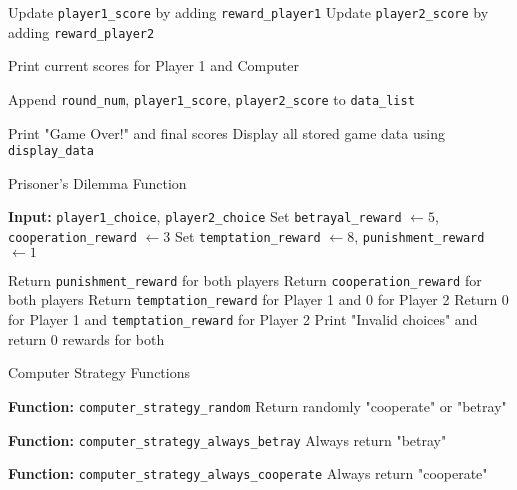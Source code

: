 \documentclass{article}
\begin{document}
\begin{algorithm}[H]
\begin{algorithmic}[1]
    \STATE Update \texttt{player1\_score} by adding \texttt{reward\_player1}
    \STATE Update \texttt{player2\_score} by adding \texttt{reward\_player2}

    \STATE Print current scores for Player 1 and Computer

    \STATE Append \texttt{round\_num}, \texttt{player1\_score}, \texttt{player2\_score} to \texttt{data\_list}

\ENDFOR

\STATE Print "Game Over!" and final scores
\STATE Display all stored game data using \texttt{display\_data}
\end{algorithmic}
\end{algorithm}

\begin{algorithm}[H]
\caption{Prisoner's Dilemma Function}
\begin{algorithmic}[1]
\STATE \textbf{Input:} \texttt{player1\_choice}, \texttt{player2\_choice}
\STATE Set \texttt{betrayal\_reward} $\gets 5$, \texttt{cooperation\_reward} $\gets 3$
\STATE Set \texttt{temptation\_reward} $\gets 8$, \texttt{punishment\_reward} $\gets 1$

    \STATE Return \texttt{punishment\_reward} for both players
    \STATE Return \texttt{cooperation\_reward} for both players
    \STATE Return \texttt{temptation\_reward} for Player 1 and 0 for Player 2
    \STATE Return 0 for Player 1 and \texttt{temptation\_reward} for Player 2
\ELSE
    \STATE Print "Invalid choices" and return 0 rewards for both
\ENDIF
\end{algorithmic}
\end{algorithm}

\begin{algorithm}[H]
\caption{Computer Strategy Functions}
\begin{algorithmic}[1]
\STATE \textbf{Function:} \texttt{computer\_strategy\_random}
    \STATE Return randomly "cooperate" or "betray"

\STATE \textbf{Function:} \texttt{computer\_strategy\_always\_betray}
    \STATE Always return "betray"

\STATE \textbf{Function:} \texttt{computer\_strategy\_always\_cooperate}
    \STATE Always return "cooperate"
\end{algorithmic}
\end{algorithm}
\end{document}
